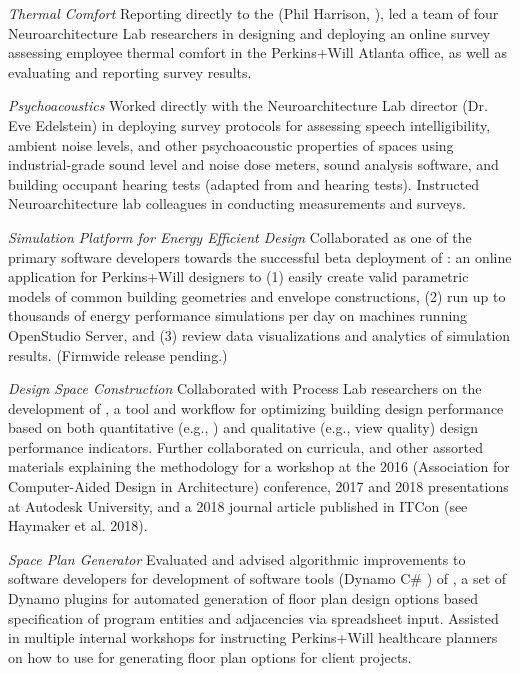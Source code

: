\documentclass[letterpaper, oneside, 10pt]{article}
\begin{document}
\textit{Thermal Comfort}\DotSep{0.25em}
Reporting directly to the  (Phil Harrison,
), led a team of four Neuroarchitecture Lab researchers
in designing and deploying an online survey assessing employee thermal
comfort in the Perkins+Will Atlanta office, as well as evaluating and
reporting survey results.

\textit{Psychoacoustics}\DotSep{0.25em}
Worked directly with the Neuroarchitecture Lab director (Dr. Eve
Edelstein) in deploying survey protocols for assessing speech
intelligibility, ambient noise levels, and other psychoacoustic properties
of spaces using industrial-grade sound level and noise dose meters, sound
analysis software, and building occupant hearing tests (adapted from
 and  hearing tests). Instructed
Neuroarchitecture lab colleagues in conducting measurements and surveys.



\textit{%
  Simulation Platform for Energy Efficient Design %
}\DotSep{0.25em}%
Collaborated as one of the primary software developers towards the
successful beta deployment of : an online application
for Perkins+Will designers to (1) easily create valid parametric models of
common building geometries and envelope constructions, (2) run up to
thousands of energy performance simulations per day on 
machines running OpenStudio Server, and (3) review 
data visualizations and analytics of simulation results. (Firmwide release
pending.)


\textit{Design Space Construction } \DotSep{0.25em}
Collaborated with Process Lab researchers on the development of , a
tool and workflow for optimizing building design performance based on both
quantitative (e.g., ) and qualitative (e.g., view quality) design
performance indicators. Further collaborated on curricula, and other
assorted materials explaining the  methodology for a workshop at
the 2016  (Association for Computer-Aided Design in Architecture)
conference, 2017 and 2018 presentations at Autodesk University, and a 2018
journal article published in ITCon (see Haymaker et al. 2018).

\textit{Space Plan Generator } \DotSep{0.25em}
Evaluated and advised algorithmic improvements to software developers for
development of software tools (Dynamo C\# ) of
, a set of Dynamo plugins for automated generation of
floor plan design options based specification of program entities and
adjacencies via spreadsheet input. Assisted in multiple internal workshops
for instructing Perkins+Will healthcare planners on how to use
 for generating floor plan options for client projects.
\end{document}
